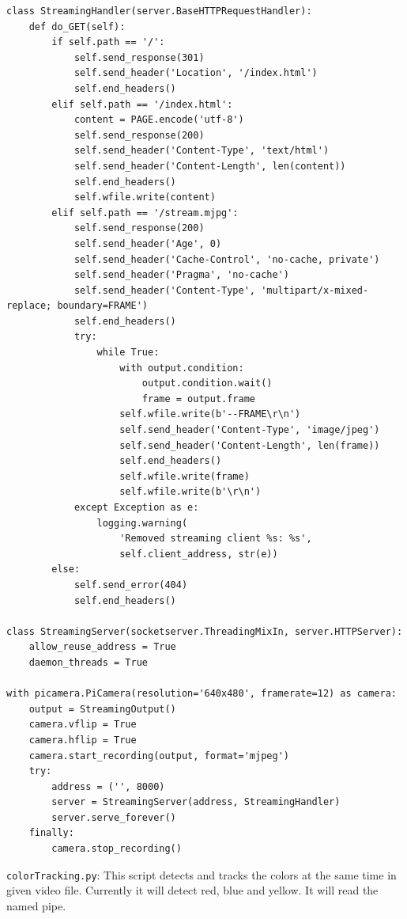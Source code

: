 \documentclass[12pt,a4paper]{article}
\begin{document}
\begin{verbatim}
class StreamingHandler(server.BaseHTTPRequestHandler):
    def do_GET(self):
        if self.path == '/':
            self.send_response(301)
            self.send_header('Location', '/index.html')
            self.end_headers()
        elif self.path == '/index.html':
            content = PAGE.encode('utf-8')
            self.send_response(200)
            self.send_header('Content-Type', 'text/html')
            self.send_header('Content-Length', len(content))
            self.end_headers()
            self.wfile.write(content)
        elif self.path == '/stream.mjpg':
            self.send_response(200)
            self.send_header('Age', 0)
            self.send_header('Cache-Control', 'no-cache, private')
            self.send_header('Pragma', 'no-cache')
            self.send_header('Content-Type', 'multipart/x-mixed-replace; boundary=FRAME')
            self.end_headers()
            try:
                while True:
                    with output.condition:
                        output.condition.wait()
                        frame = output.frame
                    self.wfile.write(b'--FRAME\r\n')
                    self.send_header('Content-Type', 'image/jpeg')
                    self.send_header('Content-Length', len(frame))
                    self.end_headers()
                    self.wfile.write(frame)
                    self.wfile.write(b'\r\n')
            except Exception as e:
                logging.warning(
                    'Removed streaming client %s: %s',
                    self.client_address, str(e))
        else:
            self.send_error(404)
            self.end_headers()

class StreamingServer(socketserver.ThreadingMixIn, server.HTTPServer):
    allow_reuse_address = True
    daemon_threads = True

with picamera.PiCamera(resolution='640x480', framerate=12) as camera:
    output = StreamingOutput()
    camera.vflip = True
    camera.hflip = True
    camera.start_recording(output, format='mjpeg')
    try:
        address = ('', 8000)
        server = StreamingServer(address, StreamingHandler)
        server.serve_forever()
    finally:
        camera.stop_recording()
\end{verbatim}
\pagebreak
\verb|colorTracking.py|: This script detects and tracks the colors at the same time in given video file. Currently it will detect red, 
blue and yellow. It will read the named pipe.
\end{document}
